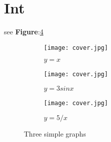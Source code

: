 \section{Int}
see \textbf{Figure}:\ref{fig:three graphs}
\begin{figure}
	\centering
	\begin{subfigure}[b]{0.3\textwidth}
		\centering
		\texttt{[image: cover.jpg]}
		\caption{$y=x$}
		\label{fig:y equals x}
	\end{subfigure}
	\hfill
	\begin{subfigure}[b]{0.3\textwidth}
		\centering
		\texttt{[image: cover.jpg]}
		\caption{$y=3sinx$}
		\label{fig:three sin x}
	\end{subfigure}
	\hfill
	\begin{subfigure}[b]{0.3\textwidth}
		\centering
		\texttt{[image: cover.jpg]}
		\caption{$y=5/x$}
		\label{fig:five over x}
	\end{subfigure}
	\caption{Three simple graphs}
	\label{fig:three graphs}
\end{figure}
